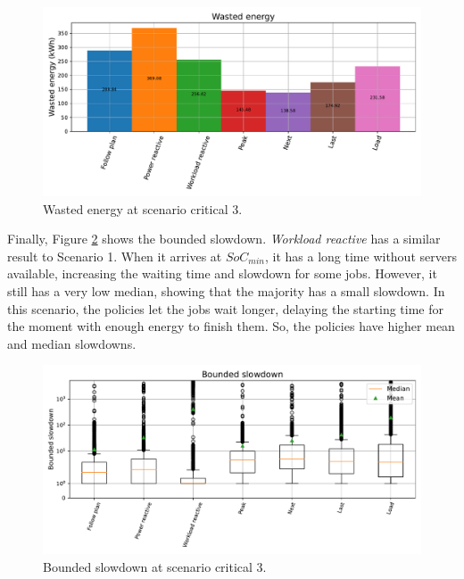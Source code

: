 \begin{figure}[!htb]
    \centering
    \includegraphics[scale=0.55]{Images/Compensations/energy_critical_3.pdf}
    \caption{Wasted energy at scenario critical 3.}
    \label{fig:energy_critical_3}
\end{figure}

Finally, Figure \ref{fig:slowdown_critical_3} shows the bounded slowdown. \emph{Workload reactive} has a similar result to Scenario 1. When it arrives at $SoC_{min}$, it has a long time without servers available, increasing the waiting time and slowdown for some jobs. However, it still has a very low median, showing that the majority has a small slowdown. In this scenario, the policies let the jobs wait longer, delaying the starting time for the moment with enough energy to finish them. So, the policies have higher mean and median slowdowns. 

\begin{figure}[!htb]
    \centering
    \includegraphics[scale=0.55]{Images/Compensations/slowdown_critical_3.pdf}
    \caption{Bounded slowdown at scenario critical 3.}
    \label{fig:slowdown_critical_3}
\end{figure}

\clearpage

